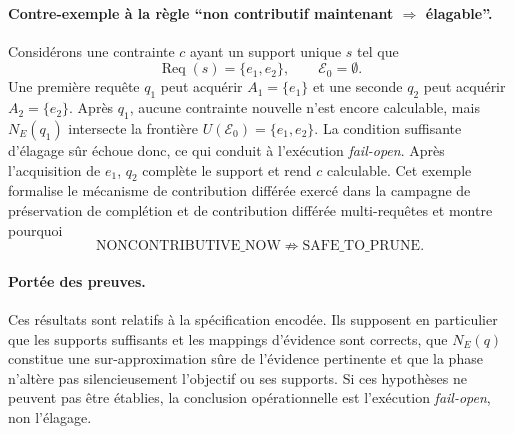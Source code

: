 \paragraph*{Contre-exemple à la règle ``non contributif maintenant $\Rightarrow$ élagable''.}
Considérons une contrainte $c$ ayant un support unique $s$ tel que
\[
\operatorname{Req}(s)=\{e_1,e_2\},\qquad \mathcal{E}_0=\emptyset.
\]
Une première requête $q_1$ peut acquérir $A_1=\{e_1\}$ et une seconde $q_2$ peut acquérir $A_2=\{e_2\}$. Après $q_1$, aucune contrainte nouvelle n'est encore calculable, mais $N_E(q_1)$ intersecte la frontière $U(\mathcal{E}_0)=\{e_1,e_2\}$. La condition suffisante d'élagage sûr échoue donc, ce qui conduit à l'exécution \emph{fail-open}. Après l'acquisition de $e_1$, $q_2$ complète le support et rend $c$ calculable. Cet exemple formalise le mécanisme de contribution différée exercé dans la campagne de préservation de complétion et de contribution différée multi-requêtes et montre pourquoi
\[
\text{NONCONTRIBUTIVE\_NOW}\not\Rightarrow\text{SAFE\_TO\_PRUNE}.
\]

\paragraph*{Portée des preuves.}
Ces résultats sont relatifs à la spécification encodée. Ils supposent en particulier que les supports suffisants et les mappings d'évidence sont corrects, que $N_E(q)$ constitue une sur-approximation sûre de l'évidence pertinente et que la phase n'altère pas silencieusement l'objectif ou ses supports. Si ces hypothèses ne peuvent pas être établies, la conclusion opérationnelle est l'exécution \emph{fail-open}, non l'élagage.
